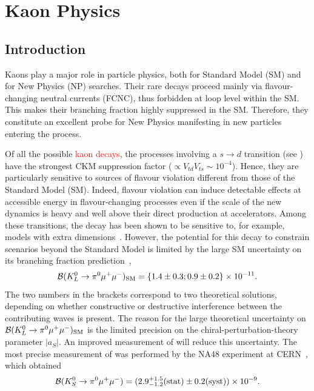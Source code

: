\chapter{Kaon Physics}
\label{KaonPhysics}
\section{Introduction}
\label{sec:Introduction}
Kaons play a major role in particle physics, both for Standard Model (SM) and for New Physics (NP) searches. Their rare decays proceed mainly via flavour-changing neutral currents (FCNC), thus forbidden at loop level within the SM. This makes their branching fraction highly suppressed in the SM. Therefore, they constitute an excellent probe for New Physics manifesting in new particles entering the process. 

Of all the possible \textcolor{red}{kaon decays}, the processes involving a $s\to d$ transition  (see ) have the strongest CKM suppression factor ($\propto V_{td}V_{ts} \sim 10^{-4} $). Hence, they are particularly sensitive to sources of flavour violation different from those of the Standard Model (SM). Indeed, flavour violation can induce detectable effects at accessible energy in flavour-changing processes
even if the scale of the new dynamics is heavy and well above their direct production at accelerators. Among these transitions, the decay \Klpizmm has been shown to be sensitive to, for example, models with extra dimensions~\cite{Bauer:2009cf}. However, the potential for this decay to constrain scenarios beyond the Standard Model is limited by the large SM uncertainty on its branching fraction prediction~\cite{Bauer:2009cf},
\begin{equation}
{{\cal B}({\ensuremath{K^{0}_{L}}}\to\ensuremath{\pi^{0}}\ensuremath{\mu^{+}}\ensuremath{\mu^{-}})_{\rm SM} = \{1.4\pm0.3; 0.9\pm0.2\}\times 10^{-11}.}
\end{equation}
The two numbers in the brackets correspond to two theoretical solutions, depending on whether constructive or destructive interference between the contributing waves is present.
The reason for the large theoretical uncertainty on $\mathcal{B} ({K^{0}_{L}}\to\pi^{0}\mu^{+}\mu^{-})_{\rm SM}$ is the limited precision on the chiral-perturbation-theory parameter $|a_S|$. An improved measurement of \BRof\Kspizmm will reduce this uncertainty.
The most precise measurement of \BRof\Kspizmm was performed by the NA48 experiment at CERN~\cite{NA48}, which obtained
\begin{equation}
{\cal B}({K^{0}_{S}}\to\pi^{0}\mu^{+}\mu^{-}) = (2.9^{+1.5}_{-1.2}\text{(stat)}\pm0.2\text{(syst)})\times10^{-9}.
\label{eq:NA48}
\end{equation}

